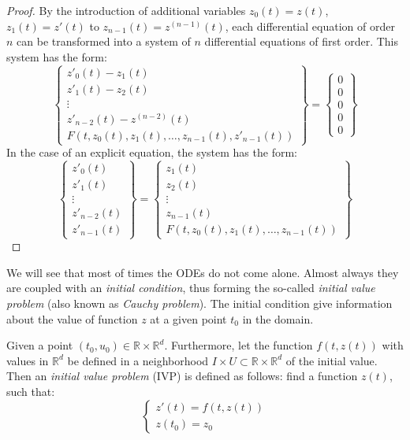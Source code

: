 \begin{proof}
	By the introduction of additional variables $z_0(t)=z(t)$, $z_1(t)=z'(t)$ to $z_{n-1}(t) = z^{(n-1)}(t)$, each differential equation of order $n$ can be transformed into a system of $n$ differential equations of first order. This system has the form:
	\begin{equation}
		\begin{Bmatrix}
			z'_0(t) - z_1(t) \\
			z'_1(t) - z_2(t) \\
			\vdots \\
			z'_{n-2}(t) - z^{(n-2)}(t) \\
			F\left(t,z_0(t),z_1(t),\dots,z_{n-1}(t), z'_{n-1}(t)\right)
		\end{Bmatrix} = 
		\begin{Bmatrix}
			0 \\ 0 \\ 0 \\ 0 \\ 0
		\end{Bmatrix}
	\end{equation}
	In the case of an explicit equation, the system has the form:
	\begin{equation}
	\begin{Bmatrix}
		z'_0(t) \\
		z'_1(t) \\
		\vdots \\
		z'_{n-2}(t) \\
		z'_{n-1}(t)
	\end{Bmatrix} = 
	\begin{Bmatrix}
		z_1(t) \\
		z_2(t) \\
		\vdots \\
		z_{n-1}(t) \\
		F\left(t,z_0(t),z_1(t),\dots,z_{n-1}(t)\right)
	\end{Bmatrix}
	\end{equation}
\end{proof}

We will see that most of times the ODEs do not come alone. Almost always they are coupled with an \textit{initial condition}, thus forming the so-called \textit{initial value problem} (also known as \textit{Cauchy problem}). The initial condition give information about the value of function $z$ at a given point $t_0$ in the domain.

\begin{definition}
	Given a point $(t_0,u_0) \in \mathbb{R} \times \mathbb{R}^d$. Furthermore, let the function $f(t,z(t))$ with values in $\mathbb{R}^d$ be defined in a neighborhood $I \times U \subset \mathbb{R} \times \mathbb{R}^d$ of the initial value. Then an \textit{initial value problem} (IVP) is	defined as follows: find a function $z(t)$, such that:
	\begin{equation}
	\begin{cases}
	z'(t) = f(t,z(t)) \\
	z(t_0) = z_0
	\end{cases}
	\end{equation}
\end{definition}

